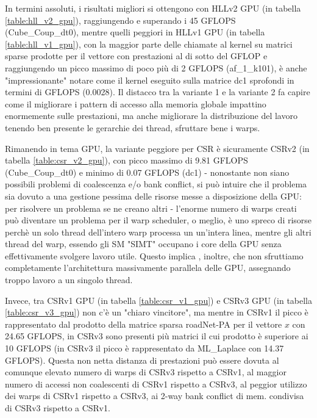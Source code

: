 \documentclass[a4paper,9pt]{extarticle}
\begin{document}
In termini assoluti, i risultati migliori si ottengono con HLLv2 GPU (in tabella 
\ref{table:hll_v2_gpu}), raggiungendo e superando i 45 GFLOPS (Cube\_Coup\_dt0), mentre quelli 
peggiori in HLLv1 GPU (in tabella \ref{table:hll_v1_gpu}), con la maggior parte delle chiamate al kernel su matrici 
sparse prodotte per il
vettore con prestazioni al di sotto del GFLOP e raggiungendo un picco massimo di poco più di 
2 GFLOPS (af\_1\_k101), è anche "impressionante" notare come il kernel eseguito sulla matrice dc1 sprofondi in termini
di GFLOPS (0.0028). Il distacco tra la variante 1 e la variante 2 fa capire come il migliorare
i pattern di accesso alla memoria globale impattino enormemente sulle prestazioni, ma anche
migliorare la distribuzione del lavoro tenendo ben presente le gerarchie dei thread, sfruttare
bene i warps.

Rimanendo in tema GPU, la variante peggiore per CSR è sicuramente CSRv2 (in tabella \ref{table:csr_v2_gpu}), con picco massimo di 9.81 GFLOPS (Cube\_Coup\_dt0) e minimo di
0.07 GFLOPS (dc1) - nonostante non siano possibili problemi di coalescenza e/o bank conflict,
si può intuire che il problema sia dovuto a una gestione pessima delle risorse messe a disposizione
della GPU: per risolvere un problema se ne creano altri - l'enorme numero di warps creati può 
diventare un problema per il warp scheduler, o meglio, è uno spreco di risorse perchè un solo
thread dell'intero warp processa un un'intera linea, mentre gli altri thread del warp, essendo
gli SM "SIMT" occupano i core della GPU senza effettivamente svolgere lavoro utile. Questo implica
, inoltre, che non sfruttiamo completamente l'architettura massivamente parallela delle GPU,
assegnando troppo lavoro a un singolo thread.

Invece, tra CSRv1 GPU (in tabella \ref{table:csr_v1_gpu}) e CSRv3 GPU (in tabella \ref{table:csr_v3_gpu}) non c'è un "chiaro vincitore", ma mentre in CSRv1 il picco è rappresentato
dal prodotto della matrice sparsa roadNet-PA per il vettore $x$ con 24.65 GFLOPS, in CSRv3 sono
presenti più matrici il cui prodotto è superiore ai 10 GFLOPS (in CSRv3 il picco è
rappresentato da ML\_Laplace con 14.37 GFLOPS). Questa non netta distanza di prestazioni 
può essere dovuta al comunque elevato numero di warps di CSRv3 rispetto a CSRv1, al maggior
numero di accessi non coalescenti di CSRv1 rispetto a CSRv3, al peggior utilizzo dei warps
di CSRv1 rispetto a CSRv3, ai 2-way bank conflict di mem. condivisa di CSRv3 rispetto a CSRv1.
\end{document}
